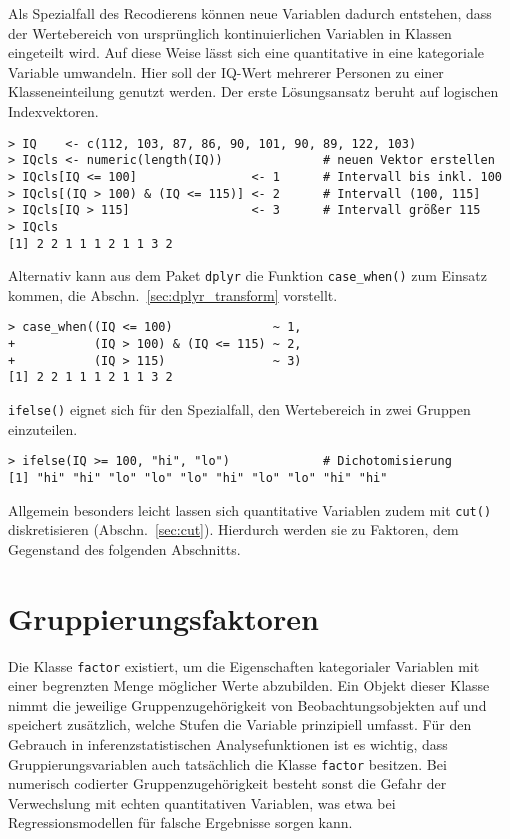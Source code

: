 Als Spezialfall des Recodierens können neue Variablen dadurch entstehen, dass der Wertebereich von ursprünglich kontinuierlichen Variablen in Klassen eingeteilt wird. Auf diese Weise lässt sich eine quantitative in eine kategoriale Variable umwandeln. Hier soll der IQ-Wert mehrerer Personen zu einer Klasseneinteilung genutzt werden. Der erste Lösungsansatz beruht auf logischen Indexvektoren.
\begin{lstlisting}
> IQ    <- c(112, 103, 87, 86, 90, 101, 90, 89, 122, 103)
> IQcls <- numeric(length(IQ))              # neuen Vektor erstellen
> IQcls[IQ <= 100]                <- 1      # Intervall bis inkl. 100
> IQcls[(IQ > 100) & (IQ <= 115)] <- 2      # Intervall (100, 115]
> IQcls[IQ > 115]                 <- 3      # Intervall größer 115
> IQcls
[1] 2 2 1 1 1 2 1 1 3 2
\end{lstlisting}

Alternativ kann aus dem Paket \lstinline!dplyr! die Funktion \lstinline!case_when()! zum Einsatz kommen, die Abschn.\ \ref{sec:dplyr_transform} vorstellt.
\begin{lstlisting}
> case_when((IQ <= 100)              ~ 1,
+           (IQ > 100) & (IQ <= 115) ~ 2,
+           (IQ > 115)               ~ 3)
[1] 2 2 1 1 1 2 1 1 3 2
\end{lstlisting}

\lstinline!ifelse()! eignet sich für den Spezialfall, den Wertebereich in zwei Gruppen einzuteilen.
\begin{lstlisting}
> ifelse(IQ >= 100, "hi", "lo")             # Dichotomisierung
[1] "hi" "hi" "lo" "lo" "lo" "hi" "lo" "lo" "hi" "hi"
\end{lstlisting}

Allgemein besonders leicht lassen sich quantitative Variablen zudem mit \lstinline!cut()! diskretisieren (Abschn.\ \ref{sec:cut}). Hierdurch werden sie zu Faktoren, dem Gegenstand des folgenden Abschnitts.

\section{Gruppierungsfaktoren}
\label{sec:factor}

Die Klasse \lstinline!factor! existiert, um die Eigenschaften kategorialer Variablen mit einer begrenzten Menge möglicher Werte abzubilden. Ein Objekt dieser Klasse nimmt die jeweilige Gruppenzugehörigkeit von Beobachtungsobjekten auf und speichert zusätzlich, welche Stufen die Variable prinzipiell umfasst. Für den Gebrauch in inferenzstatistischen Analysefunktionen ist es wichtig, dass Gruppierungsvariablen auch tatsächlich die Klasse \lstinline!factor! besitzen. Bei numerisch codierter Gruppenzugehörigkeit besteht sonst die Gefahr der Verwechslung mit echten quantitativen Variablen, was etwa bei Regressionsmodellen für falsche Ergebnisse sorgen kann.

